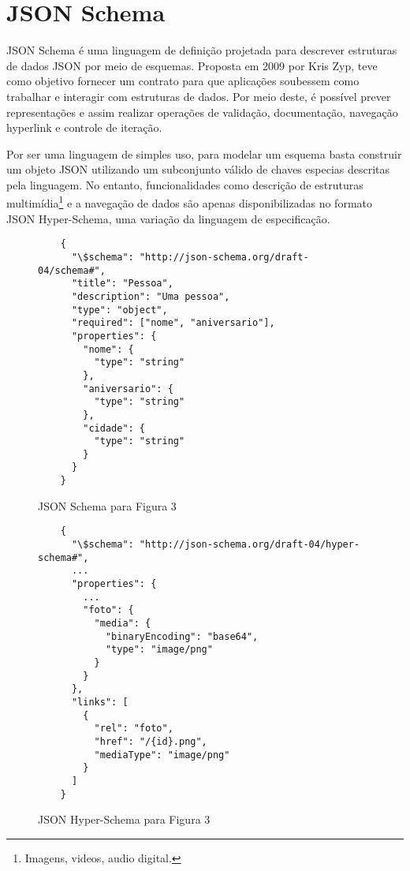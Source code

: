 \section[JSON Schema]{JSON Schema}

JSON Schema é uma linguagem de definição projetada para descrever estruturas de dados JSON por meio de esquemas. Proposta em 2009 por Kris Zyp, teve como objetivo fornecer um contrato para que aplicações soubessem como trabalhar e interagir com estruturas de dados. Por meio deste, é possível prever representações e assim realizar operações de validação, documentação, navegação hyperlink e controle de iteração.

Por ser uma linguagem de simples uso, para modelar um esquema basta construir um objeto JSON utilizando um subconjunto válido de chaves especias descritas pela linguagem. No entanto, funcionalidades como descrição de estruturas multimídia\footnote{
  Imagens, videos, audio digital.
} e a navegação de dados são apenas disponibilizadas no formato JSON Hyper-Schema, uma variação da linguagem de especificação. \cite{Jackson2016}

\begin{figure}[H]
  \centering
  \begin{verbatim}
    {
      "\$schema": "http://json-schema.org/draft-04/schema#",
      "title": "Pessoa",
      "description": "Uma pessoa",
      "type": "object",
      "required": ["nome", "aniversario"],
      "properties": {
        "nome": {
          "type": "string"
        },
        "aniversario": {
          "type": "string"
        },
        "cidade": {
          "type": "string"
        }
      }
    }
  \end{verbatim}
  \caption{JSON Schema para Figura 3}
\end{figure}

\begin{figure}[H]
  \centering
  \begin{verbatim}
    {
      "\$schema": "http://json-schema.org/draft-04/hyper-schema#",
      ...
      "properties": {
        ...
        "foto": {
          "media": {
            "binaryEncoding": "base64",
            "type": "image/png"
          }
        }
      },
      "links": [
        {
          "rel": "foto",
          "href": "/{id}.png",
          "mediaType": "image/png"
        }
      ]
    }
  \end{verbatim}
  \caption{JSON Hyper-Schema para Figura 3}
\end{figure}

